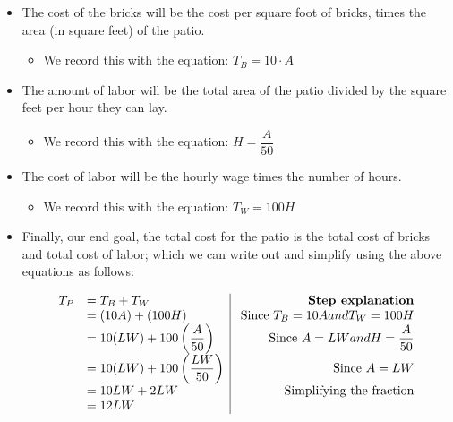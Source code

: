 \documentclass{ximera}
\begin{document}
\begin{example}
\begin{itemize}
            \item The cost of the bricks will be the cost per square foot of bricks, times the area (in square feet) of the patio.
            
            \begin{itemize}
                \item We record this with the equation: $T_B = 10 \cdot A$
            \end{itemize}
            
            \item The amount of labor will be the total area of the patio divided by the  square feet per hour they can lay.
            
            \begin{itemize}
                \item We record this with the equation: $H = \dfrac{A}{50}$
            \end{itemize}
            
            \item The cost of labor will be the hourly wage times the number of hours.
            
            \begin{itemize}
                \item We record this with the equation: $T_W = 100H$
            \end{itemize}
            
            \item Finally, our end goal, the total cost for the patio is the total cost of bricks and total cost of labor; which we can write out and simplify using the above equations as follows:
        
        \[
            \begin{array}{ll | r}
            T_P &= T_B + T_W & \text{ \textbf{Step explanation}}\\
            &= (10A) + (100H) & \text{ Since }T_B = 10A and T_W = 100H\\
            &= 10(LW) + 100\left(\dfrac{A}{50}\right) & \text{ Since }A = LW and H = \dfrac{A}{50}\\
            &= 10(LW) + 100\left(\dfrac{LW}{50}\right) & \text{ Since }A = LW\\
            &= 10LW + 2LW & \text{ Simplifying the fraction}\\
            &= 12LW
            \end{array}
        \]
        

\end{itemize}
\end{example}
\end{document}
